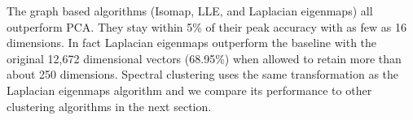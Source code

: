 % 

The graph based algorithms (Isomap, LLE, and Laplacian eigenmaps) all
outperform PCA.  They stay within 5\% of their peak accuracy with as
few as 16 dimensions.  In fact Laplacian eigenmaps outperform the
baseline with the original 12,672 dimensional vectors (68.95\%) when
allowed to retain more than about 250 dimensions.  Spectral clustering
uses the same transformation as the Laplacian eigenmaps algorithm and
we compare its performance to other clustering algorithms in the next
section.

